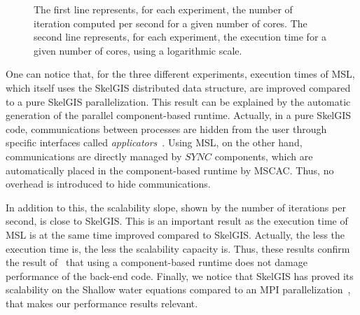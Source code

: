 \begin{figure}
\begin{center}
{
}
\end{center}
\caption{The first line represents, for each experiment, the number of iteration computed per second for a given number of cores. The second line represents, for each experiment, the execution time for a given number of cores, using a logarithmic scale.}
\label{fig:perfs}
\end{figure}

One can notice that, for the three different experiments, execution times of MSL, which itself uses the SkelGIS distributed data structure, are improved compared to a pure SkelGIS parallelization. This result can be explained by the automatic generation of the parallel component-based runtime. Actually, in a pure SkelGIS code, communications between processes are hidden from the user through specific interfaces called \emph{applicators}~\cite{CPE:CPE3494}. Using MSL, on the other hand, communications are directly managed by $SYNC$ components, which are automatically placed in the component-based runtime by MSCAC. Thus, no overhead is introduced to hide communications.

In addition to this, the scalability slope, shown by the number of iterations per second, is close to SkelGIS. This is an important result as the execution time of MSL is at the same time improved compared to SkelGIS. Actually, the less the execution time is, the less the scalability capacity is. Thus, these results confirm the result of~\cite{l2c} that using a component-based runtime does not damage performance of the back-end code. Finally, we notice that SkelGIS has proved its scalability on the Shallow water equations compared to an MPI parallelization~\cite{CPE:CPE3494}, that makes our performance results relevant. 
